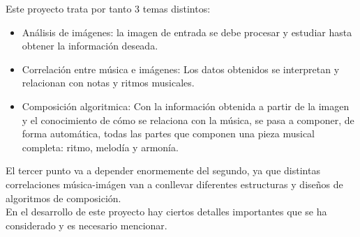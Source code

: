 		Este proyecto trata por tanto 3 temas distintos:
		
		\begin{itemize}
		
		\item Análisis de imágenes: la imagen de entrada se debe procesar y estudiar hasta obtener la información deseada.
		\item Correlación entre música e imágenes: Los datos obtenidos se interpretan y relacionan con notas y ritmos musicales.
		\item Composición algoritmica: Con la información obtenida a partir de la imagen y el conocimiento de cómo se relaciona con la música, se pasa a componer, de forma automática, todas las partes que componen una pieza musical completa: ritmo, melodía y armonía.
		\end{itemize}
		
		El tercer punto va a depender enormemente del segundo, ya que distintas correlaciones música-imágen van a conllevar diferentes estructuras y diseños de algoritmos de composición.\\
		
		En el desarrollo de este proyecto hay ciertos detalles importantes que se ha considerado y es necesario mencionar.\\		
		
